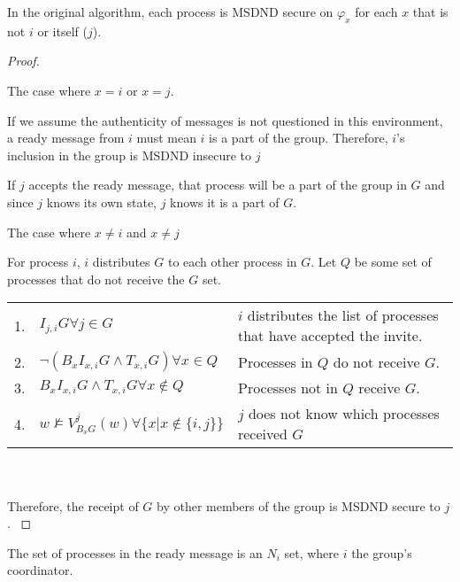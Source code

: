\begin{thm}
    In the original algorithm, each process is MSDND secure on $\varphi_x$ for each $x$ that is not $i$ or itself ($j$).
\end{thm}

\begin{proof}
\begin{case}
    The case where $x = i$ or $x = j$.
\end{case}

If we assume the authenticity of messages is not questioned in this environment, a ready message from $i$ must mean $i$ is a part of the group.
Therefore, $i$'s inclusion in the group is MSDND insecure to $j$

If $j$ accepts the ready message, that process will be a part of the group in $G$ and since $j$ knows its own state, $j$ knows it is a part of $G$.

\begin{case}
    The case where $x \neq i$ and $x \neq j$
\end{case}

For process $i$, $i$ distributes $G$ to each other process in $G$.
Let $Q$ be some set of processes that do not receive the $G$ set.

\begin{table}[h!]
\centering
\small
\begin{tabularx}{\linewidth}{l X X}
1. & $I_{j,i} G \forall j \in G $ & $i$ distributes the list of processes that have accepted the invite.  \\
2. & $\neg(B_x I_{x,i} G \wedge T_{x,i} G) \forall x \in Q$ & Processes in $Q$ do not receive $G$. \\
3. & $B_x I_{x,i} G \wedge T_{x,i} G \forall x \not \in Q$ & Processes not in $Q$ receive $G$. \\
    4. & $w \not \vDash V_{B_x G}^{j}(w) \forall \{x | x \not \in \{i,j\}\}$ & $j$ does not know which processes received $G$ \\
\end{tabularx} \\~\\
Therefore, the receipt of $G$ by other members of the group is MSDND secure to $j$.
\label{tab:readynsetproof}
\end{table}
\end{proof}

\begin{cor}
    The set of processes in the ready message is an $N_i$ set, where $i$ the group's coordinator.
\end{cor}

